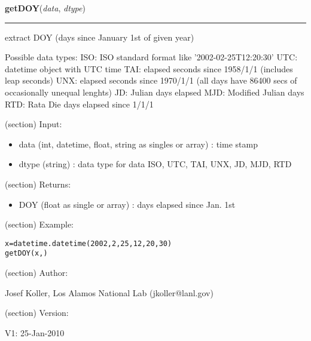     \label{spacepy:ticktock:getDOY}

    \vspace{0.5ex}

\hspace{.8\funcindent}\begin{boxedminipage}{\funcwidth}

    \raggedright \textbf{getDOY}(\textit{data}, \textit{dtype})

    \vspace{-1.5ex}

    \rule{\textwidth}{0.5\fboxrule}
\setlength{\parskip}{2ex}
    extract DOY (days since January 1st of given year)

    Possible data types: ISO: ISO standard format like 
    '2002-02-25T12:20:30' UTC: datetime object with UTC time TAI: elapsed 
    seconds since 1958/1/1 (includes leap seconds) UNX: elapsed seconds 
    since 1970/1/1 (all days have 86400 secs of occasionally unequal 
    lenghts) JD: Julian days elapsed MJD: Modified Julian days RTD: Rata 
    Die days elapsed since 1/1/1

    (section) Input:

      \begin{itemize}
      \setlength{\parskip}{0.6ex}
        \item data (int, datetime, float, string as singles or array) : time 
          stamp

        \item dtype (string) : data type for data ISO, UTC, TAI, UNX, JD, MJD, 
          RTD

      \end{itemize}

    (section) Returns:

      \begin{itemize}
      \setlength{\parskip}{0.6ex}
        \item DOY (float as single or array) : days elapsed since Jan. 1st

      \end{itemize}

    (section) Example:

\begin{alltt}
\pysrcprompt{{\textgreater}{\textgreater}{\textgreater} }x=datetime.datetime(2002,2,25,12,20,30)
\pysrcprompt{{\textgreater}{\textgreater}{\textgreater} }getDOY(x, )\end{alltt}
    (section) Author:

      Josef Koller, Los Alamos National Lab (jkoller@lanl.gov)

    (section) Version:

      V1: 25-Jan-2010

\setlength{\parskip}{1ex}
    \end{boxedminipage}

